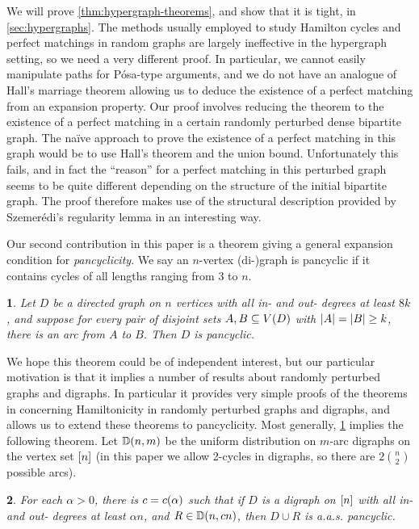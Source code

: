 \documentclass[11pt,english]{article}
\theoremstyle{plain}
\newtheorem{thm}{\protect\theoremname}
\theoremstyle{definition}
\theoremstyle{definition}
\theoremstyle{plain}
\theoremstyle{plain}
\theoremstyle{plain}
\theoremstyle{plain}
\theoremstyle{remark}
\theoremstyle{remark}
\let\originalleft\left
\let\originalright\right
\renewcommand{\left}{\mathopen{}\mathclose\bgroup\originalleft}
\renewcommand{\right}{\aftergroup\egroup\originalright}
\providecommand{\theoremname}{Theorem}
\begin{document}
We will prove \ref{thm:hypergraph-theorems}, and show that it is
tight, in \ref{sec:hypergraphs}. The methods usually employed to
study Hamilton cycles and perfect matchings in random graphs are largely
ineffective in the hypergraph setting, so we need a very different
proof. In particular, we cannot easily manipulate paths for P\'osa-type
arguments, and we do not have an analogue of Hall's marriage theorem
allowing us to deduce the existence of a perfect matching from an
expansion property. Our proof involves reducing the theorem to the
existence of a perfect matching in a certain randomly perturbed dense bipartite
graph. The na\"ive approach to prove the existence of a perfect matching in this graph would be to use Hall's theorem and the union bound. Unfortunately this fails, and in fact the ``reason'' for a perfect matching in this perturbed graph seems to be quite different depending on the structure of the initial bipartite graph. The proof therefore makes use of the structural description provided by Szemer\'edi's regularity lemma in an interesting way.

Our second contribution in this paper is a theorem giving a general
expansion condition for\emph{ pancyclicity}. We say an $n$-vertex
\mbox{(di-)}graph is pancyclic if it contains cycles of all lengths
ranging from 3 to $n$.
\begin{thm}
\label{lem:pseudorandom-pancyclic}Let $D$ be a directed graph on
$n$ vertices with all in- and out- degrees at least $8k$, and suppose
for every pair of disjoint sets $A,B\subseteq V\left(D\right)$ with $\left|A\right|=\left|B\right|\ge k$,
there is an arc from $A$ to $B$. Then $D$ is pancyclic.
\end{thm}
We hope this theorem could be of independent interest, but our particular
motivation is that it implies a number of results about randomly perturbed
graphs and digraphs. In particular it provides very simple proofs
of the theorems in \cite{BFM03} concerning Hamiltonicity in randomly
perturbed graphs and digraphs, and allows us to extend these theorems
to pancyclicity. Most generally, \ref{lem:pseudorandom-pancyclic} implies the following theorem. Let $\DD\left(n,m\right)$ be the uniform
distribution on $m$-arc digraphs on the vertex set $\range n$ (in this paper we allow 2-cycles in digraphs, so there are $2{n\choose2}$ possible arcs).

\begin{thm}
\label{thm:smoothed-pancyclic}For each $\alpha>0$, there is $\cdi=\cdi\left(\alpha\right)$ such that
if $D$ is a digraph on $\range n$ with all in- and out- degrees at least $\alpha n$,
and $R\in\DD\left(n,\cdi n\right)$, then $D\cup R$
is a.a.s.{} pancyclic.
\end{thm}
\end{document}
